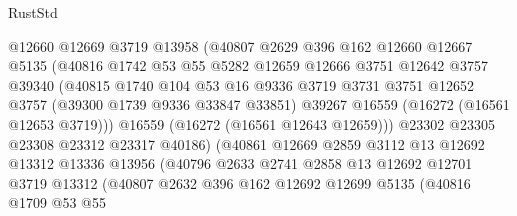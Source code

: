 \begin{lexlean}{RustStd}
\begin{coremodule}
                        @12660
                        @12669
                        @3719
                        @13958
                        (@40807
                          @2629
                          @396
                          @162
                          @12660
                          @12667
                          @5135
                          (@40816
                            @1742
                            @53
                            @55
                            @5282
                            @12659
                            @12666
                            @3751
                            @12642
                            @3757
                            @39340
                            (@40815
                              @1740
                              @104
                              @53
                              @16
                              @9336
                              @3719
                              @3731
                              @3751
                              @12652
                              @3757
                              (@39300 @1739 @9336 @33847 @33851)
                              @39267
                              @16559
                              (@16272 (@16561 @12653 @3719)))
                            @16559
                            (@16272 (@16561 @12643 @12659)))
                          @23302
                          @23305
                          @23308
                          @23312
                          @23317
                          @40186)
                        (@40861
                          @12669
                          @2859
                          @3112
                          @13
                          @12692
                          @13312
                          @13336
                          @13956
                          (@40796
                            @2633
                            @2741
                            @2858
                            @13
                            @12692
                            @12701
                            @3719
                            @13312
                            (@40807
                              @2632
                              @396
                              @162
                              @12692
                              @12699
                              @5135
                              (@40816
                                @1709
                                @53
                                @55

\end{coremodule}
\end{lexlean}
